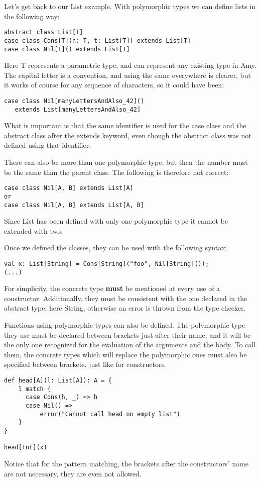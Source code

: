 
Let's get back to our List example. With polymorphic types we can define lists in the following way:

\begin{lstlisting}
abstract class List[T]
case class Cons[T](h: T, t: List[T]) extends List[T]
case class Nil[T]() extends List[T]
\end{lstlisting}

Here T represents a parametric type, and can represent any existing type in Amy. The capital letter is a convention, and using the same everywhere is clearer, but it works of course for any sequence of characters, so it could have been:
\begin{lstlisting}
case class Nil[manyLettersAndAlso_42]()
   extends List[manyLettersAndAlso_42]
\end{lstlisting}

What is important is that the same identifier is used for the case class and the abstract class after the extends keyword, even though the abstract class was not defined using that identifier.

There can also be more than one polymorphic type, but then the number must be the same than the parent class. The following is therefore not correct:
\begin{lstlisting}
case class Nil[A, B] extends List[A]
or
case class Nil[A, B] extends List[A, B]
\end{lstlisting}
Since List has been defined with only one polymorphic type it cannot be extended with two.


Once we defined the classes, they can be used with the following syntax:
\begin{lstlisting}
val x: List[String] = Cons[String]("foo", Nil[String]()); 
(...)
\end{lstlisting}

For simplicity, the concrete type \textbf{must} be mentioned at every use of a constructor. Additionally, they must be consistent with the one declared in the abstract type, here String, otherwise an error is thrown from the type checker.

Functions using polymorphic types can also be defined. The polymorphic type they use must be declared between brackets just after their name, and it will be the only one recognized for the evaluation of the arguments and the body. To call them, the concrete types which will replace the polymorphic ones must also be specified between brackets, just like for constructors.
\begin{lstlisting}
def head[A](l: List[A]): A = {
    l match {
      case Cons(h, _) => h
      case Nil() => 
          error("Cannot call head on empty list")
    }
}
  
head[Int](x)
\end{lstlisting}
Notice that for the pattern matching, the brackets after the constructors' name are not necessary, they are even not allowed.

